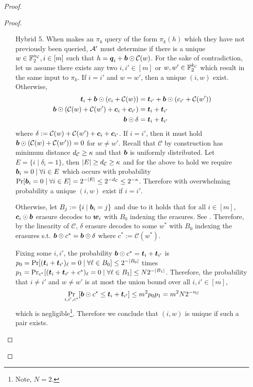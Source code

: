 \begin{proof}
\begin{proof}
\begin{enumerate}[leftmargin=1.8cm]
			
			\item[Hybrid 5.] \label{hybrid:simOutput2R} When \send makes an $\pi_k$ query of the form $\pi_k(h)$ which they have not previously been queried, $\Adv'$ must determine if there is a unique $w\in\mathbb{F}^\nc_2,i\in[m]$ such that $h=\qq_i+\bb\odot \mathcal{C}(w)$. For the sake of contradiction, let us assume there exists any two $i,i'\in[m]$ or  $w,w'\in\mathbb{F}^\kc_2$ which result in the same input to $\pi_k$. If $i=i'$ and $w=w'$, then a unique $(i,w)$ exist. Otherwise,
			\begin{align*}
			\tt_i + \bb \odot (c_i + \mathcal{C}(w)) &= \tt_{i'} +\bb \odot (c_{i'} + \mathcal{C}(w'))\\
			\bb \odot (\mathcal{C}(w) + \mathcal{C}(w') + \cc_i +\cc_{i'})  &= \tt_{i} +\tt_{i'}  \\
			\bb\odot\delta&=\tt_i+\tt_{i'}			
			\end{align*}			
			where $\delta:=\mathcal{C}(w) + \mathcal{C}(w')+\cc_i+\cc_{i'}$. If $i=i'$, then it must hold $\bb \odot (\mathcal{C}(w) + \mathcal{C}(w'))=0$ for $w\neq w'$.  Recall that $\mathcal{C}$ by construction has minimum distance $\dc\geq\kappa$ and that $\bb$ is uniformly distributed. Let $E=\{i \mid \delta_i=1\}$, then $|E|\geq \dc\geq \kappa$ and for the above to hold we require $\bb_i=0 \mid \forall i\in E$ which occurs with probability $\Pr[\bb_i=0 \mid \forall i\in E]=2^{-|E|}\leq 2^{-\dc}\leq2^{-\kappa}$.  Therefore with overwhelming probability a unique $(i,w)$ exist if $i=i'$. 
			
			Otherwise, let  $B_j:=\{i \mid \bb_i=j\}$ and due to   it holds that for all $i\in[m]$, $\cc_i\odot\bb$ erasure decodes to $\ww_i$ with $B_0$ indexing the erasures. See . Therefore, by the linearity of $\mathcal{C}$, $\delta$ erasure decodes to some $w^*$ with $B_0$ indexing the erasures s.t. $\bb \odot c^*=\bb\odot \delta$ where $c^*:= \mathcal{C}(w^*)$. 
			
			
			Fixing some $i,i'$, the probability $\bb\odot c^* = \tt_{i} +\tt_{i'}$  is $p_0=\Pr[(\tt_{i} +\tt_{i'})_{\ell}=0 \mid \forall\ell \in B_0]\leq 2^{-|B_0|}$ times $p_1=\Pr_{c^*}[(\tt_{i} +\tt_{i'}+c^*)_\ell = 0 \mid \forall \ell \in B_1]\leq N2^{-|B_1|}$. Therefore, the probability that $i\neq i'$ and $w\neq w'$ is at most the union bound over all $i,i'\in[m]$,
			\begin{equation}\label{eq:unique}
				\Pr_{i,i',c^*}[\bb\odot c^* \leq \tt_{i} +\tt_{i'}]\leq m^2p_0p_1=m^2N2^{-\nc}
			\end{equation}
			which is negligible\footnote{Note, $N=2$. }.  Therefore we conclude that $(i,w)$ is unique if such a pair exists.
			

\end{enumerate}
\end{proof}
\end{proof}
